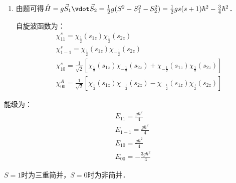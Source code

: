 \subsection{ }
\begin{enumerate}
\item 由题可得$\hat{H} = g \vec{S}_{1}\vdot \vec{S}_{2} = \frac{1}{2}g(S^{2}-S^{2}_{1}-S^{2}_{2}) = \frac{1}{2}gs(s+1)\hbar^{2}-\frac{3}{4}\hbar^2 $．

自旋波函数为：
\begin{align}
& \chi^{s}_{11} = \chi_{\frac{1}{2}}(s_{1z})\chi_{\frac{1}{2}}(s_{2z}) \\
& \chi^{s}_{1-1} = \chi_{\frac{1}{2}}(s_{1z})\chi_{-\frac{1}{2}}(s_{2z}) \\
&\chi^{s}_{10} = \frac{1}{\sqrt{2}} \left[ \chi_{\frac{1}{2}}(s_{1z})\chi_{-\frac{1}{2}}(s_{2z}) + \chi_{-\frac{1}{2}}(s_{1z})\chi_{\frac{1}{2}}(s_{2z})  \right] \\
&\chi^{A}_{00} = \frac{1}{\sqrt{2}} \left[ \chi_{\frac{1}{2}}(s_{1z})\chi_{-\frac{1}{2}}(s_{2z}) - \chi_{-\frac{1}{2}}(s_{1z})\chi_{\frac{1}{2}}(s_{2z})  \right]
\end{align}
\end{enumerate}
能级为：
\begin{align}
&E_{11} =\frac{g\hbar^{2}}{4}  \\
&E_{1-1} =\frac{g\hbar^{2}}{4}  \\
&E_{10} =\frac{g\hbar^{2}}{4}  \\
&E_{00} =-\frac{3g\hbar^{2}}{4}  
\end{align}

$S=1$时为三重简并，$S=0$时为非简并．